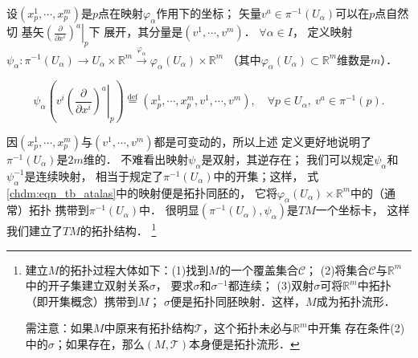 设$(x_p^1,\cdots,x_p^m)$是$p$点在映射$\varphi_\alpha$作用下的坐标；
矢量$v^a\in \pi^{-1} (U_\alpha)$可以在$p$点自然切
基矢$\left.\left(\frac{\partial }{\partial x^i}\right)^a \right | _p$下
展开，其分量是$(v^1,\cdots,v^m)$．
$\forall \alpha \in I$，
定义映射$\psi_\alpha: \pi^{-1} (U_\alpha) \to U_\alpha \times \mathbb{R}^m 
\overset{\varphi_\alpha}{\longrightarrow} \varphi_\alpha(U_\alpha) \times \mathbb{R}^m $
（其中$\varphi_\alpha(U_\alpha) \subset \mathbb{R}^m$维数是$m$）．
\begin{small}
\begin{equation}\label{chdm:eqn_tb_atalas}
    \psi_\alpha\left(v^i \left. \left(\frac{\partial }{\partial x^i}\right)^a 
    \right | _p \right) \overset{\mathrm {def}}{=} \left(x_p^1,\cdots,x_p^m, v^1,\cdots,v^m\right),
    \quad \forall p\in U_\alpha,\ v^a\in \pi^{-1} (p).
\end{equation}
\end{small}
因$(x_p^1,\cdots,x_p^m)$与$(v^1,\cdots,v^m)$都是可变动的，所以上述
定义更好地说明了$\pi^{-1} (U_\alpha)$是$2m$维的．
不难看出映射$\psi_\alpha$是双射，其逆存在；
我们可以规定$\psi_\alpha$和$\psi_\alpha^{-1}$是连续映射，
相当于规定了$\pi^{-1} (U_\alpha)$中的开集；这样，
式\eqref{chdm:eqn_tb_atalas}中的映射便是拓扑同胚的，
它将$\varphi_\alpha(U_\alpha) \times \mathbb{R}^m $中的（通常）拓扑
携带到$\pi^{-1} (U_\alpha)$中．
很明显$(\pi^{-1} (U_\alpha),\psi_\alpha)$是$TM$一个坐标卡，
这样我们建立了$TM$的拓扑结构．
{\footnote{建立$M$的拓扑过程大体如下：(1)找到$M$的一个覆盖集合$\mathcal{C}$；
        (2)将集合$\mathcal{C}$与$\mathbb{R}^m$中的开子集建立双射关系$\sigma$，
        要求$\sigma$和$\sigma^{-1}$都连续；
        (3)双射$\sigma$可将$\mathbb{R}^m$中拓扑（即开集概念）携带到$M$；
        $\sigma$便是拓扑同胚映射．这样，$M$成为拓扑流形．
        
    需注意：如果$M$中原来有拓扑结构$\mathcal{T}$，这个拓扑未必与$\mathbb{R}^m$中开集
存在条件(2)中的$\sigma$；如果存在，那么$(M,\mathcal{T})$本身便是拓扑流形．}}



